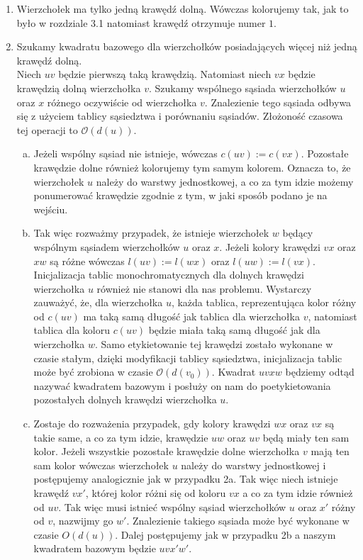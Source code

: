 \documentclass[12pt,a4paper,titlepage]{article}
\begin{document}
\begin{enumerate}
\item Wierzchołek ma tylko jedną krawędź dolną. Wówczas kolorujemy tak, jak to było w rozdziale 3.1 natomiast krawędź otrzymuje numer $1$. 
\item Szukamy kwadratu bazowego dla wierzchołków posiadających więcej niż jedną krawędź dolną. \\
Niech $uv$ będzie pierwszą taką krawędzią. Natomiast niech $vx$ będzie krawędzią dolną wierzchołka $v$. Szukamy wspólnego sąsiada wierzchołków $u$ oraz $x$ różnego oczywiście od wierzchołka $v$. Znalezienie tego sąsiada odbywa się z użyciem tablicy sąsiedztwa i porównaniu sąsiadów. Złożoność czasowa tej operacji to $\mathcal{O}(d(u))$.\\
\begin{enumerate}[a)]
\item
Jeżeli wspólny sąsiad nie istnieje, wówczas $c(uv):=c(vx)$. Pozostałe krawędzie dolne również kolorujemy tym samym kolorem. Oznacza to, że wierzchołek $u$ należy do warstwy jednostkowej, a co za tym idzie możemy ponumerować krawędzie zgodnie z tym, w jaki sposób podano je na wejściu.\\
\item
Tak więc rozważmy przypadek, że istnieje wierzchołek $w$ będący wspólnym sąsiadem wierzchołków $u$ oraz $x$. Jeżeli kolory krawędzi $vx$ oraz $xw$ są różne wówczas $l(uv):=l(wx)$ oraz $l(uw):=l(vx)$. Inicjalizacja tablic monochromatycznych dla dolnych krawędzi wierzchołka $u$ również nie stanowi dla nas problemu. Wystarczy zauważyć, że, dla wierzchołka $u$, każda tablica, reprezentująca kolor różny od $c(uv)$ ma taką samą długość jak tablica dla wierzchołka $v$, natomiast tablica dla koloru $c(uv)$ będzie miała taką samą długość jak dla wierzchołka $w$. Samo etykietowanie tej krawędzi zostało wykonane w czasie stałym, dzięki modyfikacji tablicy sąsiedztwa, inicjalizacja tablic może być zrobiona w czasie $\mathcal{O}(d(v_0))$. Kwadrat $uvxw$ będziemy odtąd nazywać kwadratem bazowym i posłuży on nam do poetykietowania pozostałych dolnych krawędzi wierzchołka $u$.
\item
Zostaje do rozważenia przypadek, gdy kolory krawędzi $wx$ oraz $vx$ są takie same, a co za tym idzie, krawędzie $uw$ oraz $uv$ będą miały ten sam kolor. Jeżeli wszystkie pozostałe krawędzie dolne wierzchołka $v$ mają ten sam kolor wówczas wierzchołek $u$ należy do warstwy jednostkowej i postępujemy analogicznie jak w przypadku 2a. Tak więc niech istnieje krawędź $vx'$, której kolor różni się od koloru $vx$ a co za tym idzie również od $uv$. Tak więc musi istnieć wspólny sąsiad wierzchołków $u$ oraz $x'$ różny od $v$, nazwijmy go $w'$. Znalezienie takiego sąsiada może być wykonane w czasie $O(d(u))$. Dalej postępujemy jak w przypadku 2b a naszym kwadratem bazowym będzie $uvx'w'$.

\end{enumerate}
\end{enumerate}
\end{document}
